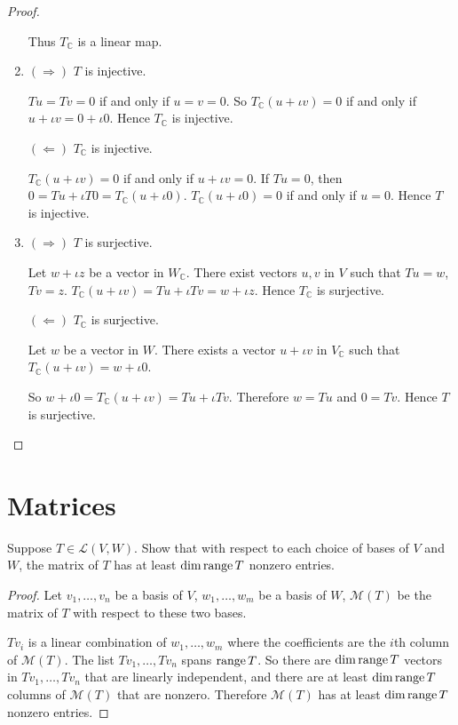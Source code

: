 \begin{proof}
\begin{enumerate}[label={(\alph*)}]
              Thus $T_{\mathbb{C}}$ is a linear map.
        \item $(\Rightarrow)$ $T$ is injective.

              $Tu = Tv = 0$ if and only if $u = v = 0$. So $T_{\mathbb{C}}(u + \iota v) = 0$ if and only if $u + \iota v = 0 + \iota 0$. Hence $T_{\mathbb{C}}$ is injective.

              $(\Leftarrow)$ $T_{\mathbb{C}}$ is injective.

              $T_{\mathbb{C}}(u + \iota v) = 0$ if and only if $u + \iota v = 0$. If $Tu = 0$, then $0 = Tu + \iota T0 = T_{\mathbb{C}}(u + \iota 0)$. $T_{\mathbb{C}}(u + \iota 0) = 0$ if and only if $u = 0$. Hence $T$ is injective.
        \item $(\Rightarrow)$ $T$ is surjective.

              Let $w + \iota z$ be a vector in $W_{\mathbb{C}}$. There exist vectors $u, v$ in $V$ such that $Tu = w$, $Tv = z$. $T_{\mathbb{C}}(u + \iota v) = Tu + \iota Tv = w + \iota z$. Hence $T_{\mathbb{C}}$ is surjective.

              $(\Leftarrow)$ $T_{\mathbb{C}}$ is surjective.

              Let $w$ be a vector in $W$. There exists a vector $u + \iota v$ in $V_{\mathbb{C}}$ such that $T_{\mathbb{C}}(u + \iota v) = w + \iota 0$.

              So $w + \iota 0 = T_{\mathbb{C}}(u + \iota v) = Tu + \iota Tv$. Therefore $w = Tu$ and $0 = Tv$. Hence $T$ is surjective.
    \end{enumerate}
\end{proof}
\newpage

\section{Matrices}

\begin{exercise}
    Suppose $T \in \mathcal{L}(V, W)$. Show that with respect to each choice of bases of $V$ and $W$, the matrix of $T$ has at least $\dim \text{range}\,{T}$ nonzero entries.
\end{exercise}

\begin{proof}
    Let $v_{1}, \ldots, v_{n}$ be a basis of $V$, $w_{1}, \ldots, w_{m}$ be a basis of $W$, $\mathcal{M}(T)$ be the matrix of $T$ with respect to these two bases.

    $Tv_{i}$ is a linear combination of $w_{1}, \ldots, w_{m}$ where the coefficients are the $i$th column of $\mathcal{M}(T)$. The list $Tv_{1}, \ldots, Tv_{n}$ spans $\text{range}\,{T}$. So there are $\dim\text{range}\,{T}$ vectors in $Tv_{1}, \ldots, Tv_{n}$ that are linearly independent, and there are at least $\dim\text{range}\,{T}$ columns of $\mathcal{M}(T)$ that are nonzero. Therefore $\mathcal{M}(T)$ has at least $\dim\text{range}\,{T}$ nonzero entries.
\end{proof}
\newpage

